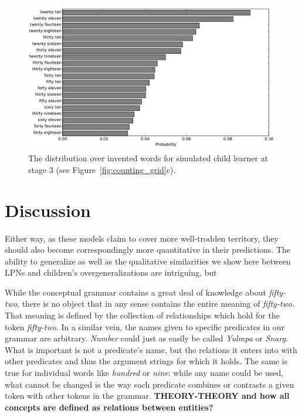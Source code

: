 \documentclass[10pt,letterpaper]{article}
\begin{document}
\begin{figure}
\includegraphics[width=0.9\linewidth]{figures/inventedWords}
\caption{The distribution over invented words for simulated child
  learner at stage
  3 (see Figure~\ref{fig:counting_grid}c). \label{fig:inventedWords}}
\end{figure}


\section{Discussion}


Either way, as these models claim to cover more well-trodden
territory, they should also become correspondingly more quantitative
in their predictions. The ability to generalize as well as the
qualitative similarities we show here between LPNs and children's
overgeneralizations are intriguing, but 


While the conceptual grammar contains a great deal of knowledge about
\emph{fifty-two}, there is no object that in any sense contains the
entire meaning of \emph{fifty-two}. That meaning is defined by the
collection of relationships which hold for the token \emph{fifty-two}.
In a similar vein, the names given to specific predicates in our
grammar are arbitrary. \emph{Number} could just as easily be called
\emph{Yulmpa} or \emph{Snarg}. What is important is not a predicate's
name, but the relations it enters into with other predicates and thus
the argument strings for which it holds. The same is true for
individual words like \emph{hundred} or \emph{nine}: while any name
could be used, what cannot be changed is the way each predicate
combines or contrasts a given token with other tokens in the grammar.
{\bf THEORY-THEORY and how all concepts are defined as relations
  between entities?}
\end{document}
